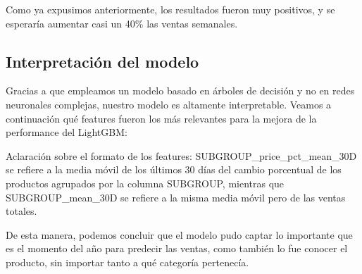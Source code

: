 \documentclass[12pt,a4paper]{article}
\begin{document}
\vspace{0.2cm}

Como ya expusimos anteriormente, los resultados fueron muy positivos, y se esperaría aumentar casi un 40\% las 
ventas semanales.


\subsection{Interpretación del modelo}

Gracias a que empleamos un modelo basado en árboles de decisión y no en redes neuronales complejas, nuestro modelo es altamente interpretable. 
Veamos a continuación qué features fueron los más relevantes para la mejora de la performance del LightGBM: 

\begin{center}
\end{center}

Aclaración sobre el formato de los features: SUBGROUP\_price\_pct\_mean\_30D se refiere a la media móvil de los últimos 30 días 
del cambio porcentual de los productos agrupados por la columna SUBGROUP, mientras que SUBGROUP\_mean\_30D se refiere a la misma media móvil 
pero de las ventas totales.

\vspace{0.2cm}

De esta manera, podemos concluir que el modelo pudo captar lo importante que es el momento del año para predecir las ventas, como también lo fue 
conocer el producto, sin importar tanto a qué categoría pertenecía. 

\vspace{0.2cm}
\end{document}
